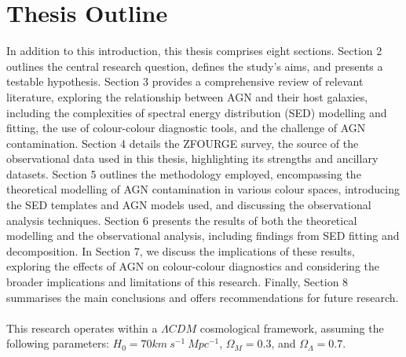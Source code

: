 \section{Thesis Outline}
In addition to this introduction, this thesis comprises eight sections. Section 2 outlines the central research question, defines the study's aims, and presents a testable hypothesis. Section 3 provides a comprehensive review of relevant literature, exploring the relationship between AGN and their host galaxies, including the complexities of spectral energy distribution (SED) modelling and fitting, the use of colour-colour diagnostic tools, and the challenge of AGN contamination. Section 4 details the ZFOURGE survey, the source of the observational data used in this thesis, highlighting its strengths and ancillary datasets. Section 5 outlines the methodology employed, encompassing the theoretical modelling of AGN contamination in various colour spaces, introducing the SED templates and AGN models used, and discussing the observational analysis techniques. Section 6 presents the results of both the theoretical modelling and the observational analysis, including findings from SED fitting and decomposition. In Section 7, we discuss the implications of these results, exploring the effects of AGN on colour-colour diagnostics and considering the broader implications and limitations of this research. Finally, Section 8 summarises the main conclusions and offers recommendations for future research.\\\\
This research operates within a $\Lambda CDM$ cosmological framework, assuming the following parameters: $H_0 = 70 km \ s^{-1} \ Mpc^{-1}$, $\Omega_M = 0.3$, and $\Omega_{\Lambda} = 0.7$.
